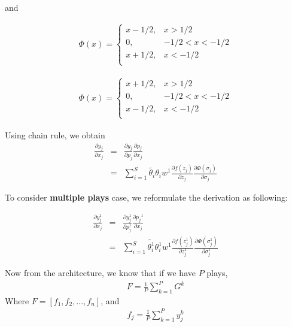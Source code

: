 \documentclass[11pt]{article}
\begin{document}
and

\begin{eqnarray}
\Phi(x) =
        \begin{cases}
        x - 1/2, & x > 1/2 \\
        0, & -1/2 < x < -1/2 \\
        x + 1/2, & x < -1/2 \\
        \end{cases}
\end{eqnarray}

\begin{eqnarray}
\Phi(x) =
        \begin{cases}
        x + 1/2, & x > 1/2 \\
        0, & -1/2 < x < -1/2 \\
        x - 1/2, & x < -1/2 \\
        \end{cases}
\end{eqnarray}


Using chain rule, we obtain
\begin{eqnarray}
\frac{\partial y_{j}}{\partial x_{j}} &=& \frac{\partial y_{j}}{\partial p_{j}} \frac{\partial p_{j}}{\partial x_{j}} \\
                                      &=& \sum_{i=1}^{S} \tilde{\theta_{i}} \theta_{i} w^{1} \frac{\partial f(z_j)}{\partial z_{j}} \frac{\partial{\Phi(\sigma_{j})}}{\partial{\sigma_{j}}}
\end{eqnarray}


To consider \textbf{multiple plays} case, we reformulate the derivation as following:

\begin{eqnarray}
\frac{\partial {y_{j}^{1}}}{\partial x_{j}} &=& \frac{\partial{y_{j}^{1}}}{\partial{p_{j}^{1}}} \frac{\partial{ p_{j}}^{1}}{\partial x_{j}} \\
                                      &=& \sum_{i=1}^{S} \tilde{\theta_{i}^{1}} \theta_{i}^{1} w^{1} \frac{\partial f(z_{j}^{1})}{\partial z_{j}^{1}} \frac{\partial{\Phi(\sigma_{j}^{1})}}{\partial{\sigma_{j}^{1}}}
\end{eqnarray}


Now from the architecture, we know that if we have \(P\) plays,
\begin{eqnarray}
F = \frac{1}{P} \sum_{k=1}^{P} G^{k}
\end{eqnarray}
Where \(F=[f_1, f_2, ..., f_n]\),
and
\begin{eqnarray}
f_{j} = \frac{1}{P} \sum_{k=1}^{P} y_{j}^{k}
\end{eqnarray}
\end{document}
